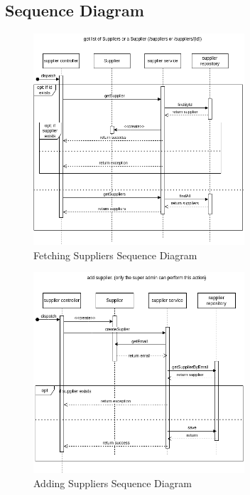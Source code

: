 \subsection{Sequence Diagram}
\begin{figure}[H]
\centering    \includegraphics[width=0.7\textwidth]{sections/BLL/getSuppliers_sequence.png}
    \caption{Fetching Suppliers Sequence Diagram}
    \label{fig:SD1}
\end{figure}
\begin{figure}[H]
\centering    \includegraphics[width=0.7\textwidth]{sections/BLL/sequence_addSupplier.png}
    \caption{Adding Suppliers Sequence Diagram}
    \label{fig:SD2}
\end{figure}
